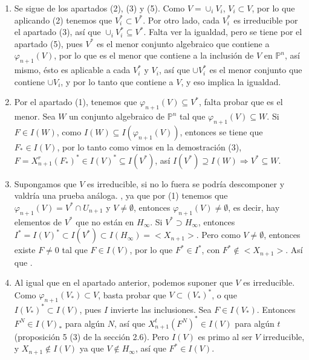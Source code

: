 \begin{Dem}
\begin{enumerate}
  \item Se sigue de los apartados (2), (3) y (5). Como $V=\cup_i V_i$, $V_i\subset V$, por lo que aplicando (2) tenemos que $V_i^*\subset V^*$. Por otro lado, cada $V_i^*$ es irreducible por el apartado (3), así que $\cup_i V_i^*\subseteq V^*$. Falta ver la igualdad, pero se tiene por el apartado (5), pues $V^*$ es el menor conjunto algebraico que contiene a $\varphi_{n+1}(V)$, por lo que es el menor que contiene a la inclusión de $V$ en $\mathbb{P}^n$, así mismo, ésto es aplicable a cada $V_i^*$ y $V_i$, así que $\cup V_i^*$ es el menor conjunto que contiene $\cup V_i$, y por lo tanto que contiene a $V$, y eso implica la igualdad.  

  \item Por el apartado (1), tenemos que $\varphi_{n+1}(V)\subseteq V^*$, falta probar que es el menor. Sea $W$ un conjunto algebraico de $\mathbb{P}^n$ tal que $\varphi_{n+1}(V)\subseteq W$. Si $F\in I(W)$, como $I(W)\subseteq I(\varphi_{n+1}(V))$, entonces se tiene que $F_*\in I(V)$, por lo tanto como vimos en la demostración (3), $F=X_{n+1}^r(F_*)^* \in I(V)^*\subseteq I(V^*)$, así $I(V^*) \supseteq I(W) \Rightarrow V^*\subseteq W$.

  \item Supongamos que $V$ es irreducible, si no lo fuera se podría descomponer y valdría una prueba análoga. , ya que por (1) tenemos que $\varphi_{n+1}(V)=V^*\cap U_{n+1}$ y $V\neq \emptyset$, entonces $\varphi_{n+1}(V) \neq \emptyset$, es decir, hay elementos de $V^*$ que no están en $H_\infty$. Si $V^*\supset H_\infty$, entonces $I^*=I(V)^*\subset I(V^*)\subset I(H_\infty)=<X_{n+1}>$. Pero como $V\neq \emptyset$, entonces existe $F\neq 0$ tal que $F\in I(V)$, por lo que $F^*\in I^*$, con $F^*\not \in <X_{n+1}>$. Así que .

    \item Al igual que en el apartado anterior, podemos suponer que $V$ es irreducible. Como $\varphi_{n+1}(V_*)\subset V$, basta probar que $V\subset (V_*)^*$, o que $I(V_*)^*\subset I(V)$, pues $I$ invierte las inclusiones. Sea $F\in I(V_*)$. Entonces $F^N\in I(V)_*$ para algún $N$, así que $X_{n+1}^t(F^N)^*\in I(V)$ para algún $t$ (proposición 5 (3) de la sección 2.6). Pero $I(V)$ es primo al ser $V$ irreducible, y $X_{n+1}\not \in I(V)$ ya que $V\not \in H_\infty$, así que $F^*\in I(V)$. 
  \end{enumerate}
\end{Dem}

